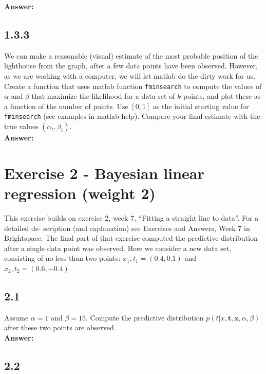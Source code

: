\documentclass[a4paper]{article}
\begin{document}
\textbf{Answer:}\\



\subsection*{1.3.3}

We can make a reasonable (visual) estimate of the most probable position of the lighthouse from the graph, after a few data points have been observed. However, as we are working with a computer, we will let matlab do the dirty work for us.\\

Create a function that uses matlab function \texttt{fminsearch} to compute the values of $\alpha$ and $\beta$ that maximize the likelihood for a data set of $k$ points, and plot these as a function of the number of points. Use $[0, 1]$ as the initial starting value for \texttt{ fminsearch} (see examples in matlab-help). Compare your final estimate with the true values $(\alpha_t,\beta_t)$.\\

\textbf{Answer:}\\



\section*{Exercise 2 - Bayesian linear regression (weight 2)}

This exercise builds on exercise 2, week 7, “Fitting a straight line to data”. For a detailed de- scription (and explanation) see Exercises and Answers, Week 7 in Brightspace. The final part of that exercise computed the predictive distribution after a single data point was observed. Here we consider a new data set, consisting of no less than two points: ${x_1,t_1} = (0.4,0.1)$ and ${x_2, t_2} = (0.6, -0.4)$.


\subsection*{2.1}

Assume $\alpha = 1$ and $\beta = 15$. Compute the predictive distribution $p(t|x, \textbf{t}, \textbf{x}, \alpha, \beta)$ after these two points are observed.\\

\textbf{Answer:}\\


\subsection*{2.2}
\end{document}
